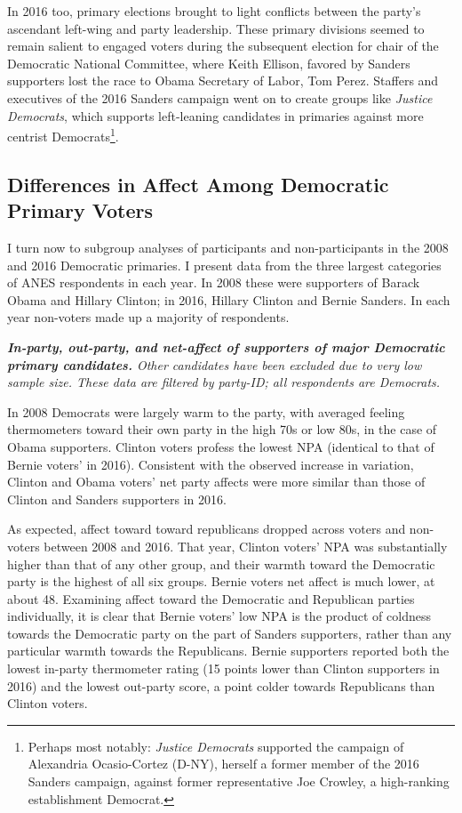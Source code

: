 \documentclass[12pt]{article}
\begin{document}
In 2016 too, primary elections brought to light conflicts between the party's ascendant left-wing and party leadership. These primary divisions seemed to remain salient to engaged voters during the subsequent election for chair of the Democratic National Committee, where Keith Ellison, favored by Sanders supporters lost the race to Obama Secretary of Labor, Tom Perez. Staffers and executives of the 2016 Sanders campaign went on to create groups like \textit{Justice Democrats}, which supports left-leaning candidates in primaries against more centrist Democrats\footnote{Perhaps most notably: \textit{Justice Democrats} supported the campaign of Alexandria Ocasio-Cortez (D-NY), herself a former member of the 2016 Sanders campaign, against former representative Joe Crowley, a high-ranking establishment Democrat.}. 




 

\subsection{Differences in Affect Among Democratic Primary Voters}
I turn now to subgroup analyses of participants and non-participants in the 2008 and 2016 Democratic primaries. I present data from the three largest categories of ANES respondents in each year. In 2008 these were supporters of Barack Obama and Hillary Clinton; in 2016, Hillary Clinton and Bernie Sanders. In each year non-voters made up a majority of respondents.
\begin{table}[H]

\caption{\label{table} \textit{\textbf{In-party, out-party, and net-affect of supporters of major Democratic primary candidates.} Other candidates have been excluded due to very low sample size. These data are filtered by party-ID; all respondents are Democrats.}}
\end{table}
In 2008 Democrats were largely warm to the party, with averaged feeling thermometers toward their own party in the high 70s or low 80s, in the case of Obama supporters. Clinton voters profess the lowest NPA (identical to that of Bernie voters' in 2016). Consistent with the observed increase in variation, Clinton and Obama voters' net party affects were more similar than those of Clinton and Sanders supporters in 2016.

As expected, affect toward toward republicans dropped across voters and non-voters between 2008 and 2016.  That year, Clinton voters' NPA was substantially higher than that of any other group, and their warmth toward the Democratic party is the highest of all six groups. Bernie voters net affect is much lower, at about 48. Examining affect toward the Democratic and Republican parties individually, it is clear that Bernie voters' low NPA is the product of coldness towards the Democratic party on the part of Sanders supporters, rather than any particular warmth towards the Republicans. Bernie supporters reported both the lowest in-party thermometer rating (15 points lower than Clinton supporters in 2016) and the lowest out-party score, a point colder towards Republicans than Clinton voters.
\end{document}
